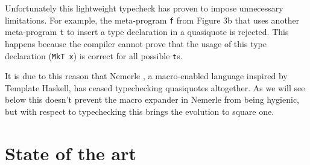 \documentclass[10pt,journal,a4paper]{IEEEtran}
\begin{document}
Unfortunately this lightweight typecheck has proven to impose unnecessary limitations.
For example, the meta-program \texttt{f} from Figure 3b
that uses another meta-program \texttt{t} to insert a type declaration in a quasiquote is rejected.
This happens because the compiler cannot prove that the usage of this type declaration (\texttt{MkT x})
is correct for all possible \texttt{t}s.

It is due to this reason that Nemerle \cite{skalski05, skalski04},
a macro-enabled language inspired by Template Haskell,
has ceased typechecking quasiquotes altogether. As we will see below this doesn't prevent
the macro expander in Nemerle from being hygienic, but with respect to typechecking
this brings the evolution to square one.

\section{State of the art}
\end{document}
